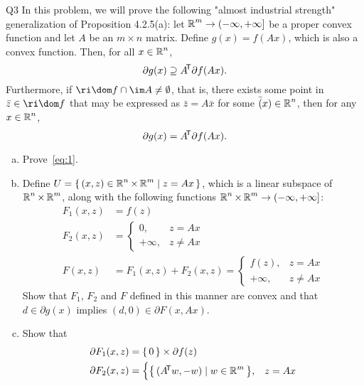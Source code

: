 \documentclass{article}
\begin{document}
\begin{problem}
    {Q3}
    In this problem, we will prove the following "almost industrial strength" generalization of Proposition 4.2.5(a): let $\operatorname{\mathbb{R}}^m\rightarrow(-\infty,+\infty]$ be a proper convex function and let $A$ be an $m\times n$ matrix. Define $g(x)=f(Ax)$, which is also a convex function. Then, for all $x\in \operatorname{\mathbb{R}}^n$,
    \begin{equation}
        \partial g(x)\supseteq A\!^{\mathsf{T}}\partial f(Ax).\label{eq:1}
    \end{equation}
    Furthermore, if $\ri\dom f\cap\im A\neq\emptyset$, that is, there exists some point in $\bar{z}\in\ri\dom f$ that may be expressed as $\bar{z}=A\bar{x}$ for some $\bar(x)\in\operatorname{\mathbb{R}}^n$, then for any $x\in\operatorname{\mathbb{R}}^n$,
    \begin{equation}
        \partial g(x)=A\!^{\mathsf{T}}\partial f(Ax).\label{eq:2}
    \end{equation}
    \begin{enumerate}[(a)]
        \item Prove~\cref{eq:1}.
        \item Define $U=\left\lbrace\,(x,z)\in\operatorname{\mathbb{R}}^n\times\operatorname{\mathbb{R}}^m\mid z=Ax\,\right\rbrace$, which is a linear subspace of $\operatorname{\mathbb{R}}^n\times\operatorname{\mathbb{R}}^m$, along with the following functions $\operatorname{\mathbb{R}}^n\times\operatorname{\mathbb{R}}^m\rightarrow(-\infty,+\infty]$: {
            \begin{align*}
                F_1(x,z)&=f(z) \\
                F_2(x,z)&=\begin{cases}
                    0, & z=Ax \\
                    +\infty, & z\neq Ax
                \end{cases} \\
                F(x,z)&=F_1(x,z)+F_2(x,z)=\begin{cases}
                    f(z), & z=Ax \\
                    +\infty, & z\neq Ax
                \end{cases}
            \end{align*}
        }
        Show that $F_1$, $F_2$ and $F$ defined in this manner are convex and that $d\in\partial g(x)$ implies $(d,0)\in\partial F(x,Ax)$.
        \item Show that {
            \begin{align*}
                \partial F_1(x,z) &= \set{0}\times\partial f(z) \\
                \partial F_2(x,z) &= \begin{cases}
                    \set{(A\trn w,-w)\mid w\in\R^m}, & z=Ax \\

\end{cases}
\end{align*}}
\end{enumerate}
\end{problem}
\end{document}
